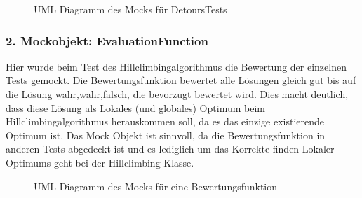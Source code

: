  \begin{figure}[H]
  \centering
  
  \caption{UML Diagramm des Mocks für DetoursTests}
\end{figure}

 
 \subsubsection{2. Mockobjekt: EvaluationFunction}
 
 Hier wurde beim Test des Hillclimbingalgorithmus die Bewertung der einzelnen Tests gemockt. Die Bewertungsfunktion bewertet alle Lösungen gleich gut bis auf die Lösung wahr,wahr,falsch, die bevorzugt bewertet wird. Dies macht deutlich, dass diese Lösung als Lokales (und globales) Optimum beim Hillclimbingalgorithmus herauskommen soll, da es das einzige existierende Optimum ist. Das Mock Objekt ist sinnvoll, da die Bewertungsfunktion in anderen Tests abgedeckt ist und es lediglich um das Korrekte finden Lokaler Optimums geht bei der Hillclimbing-Klasse.
 
  \begin{figure}[H]
  \centering
  
  \caption{UML Diagramm des Mocks für eine Bewertungsfunktion}
\end{figure}
